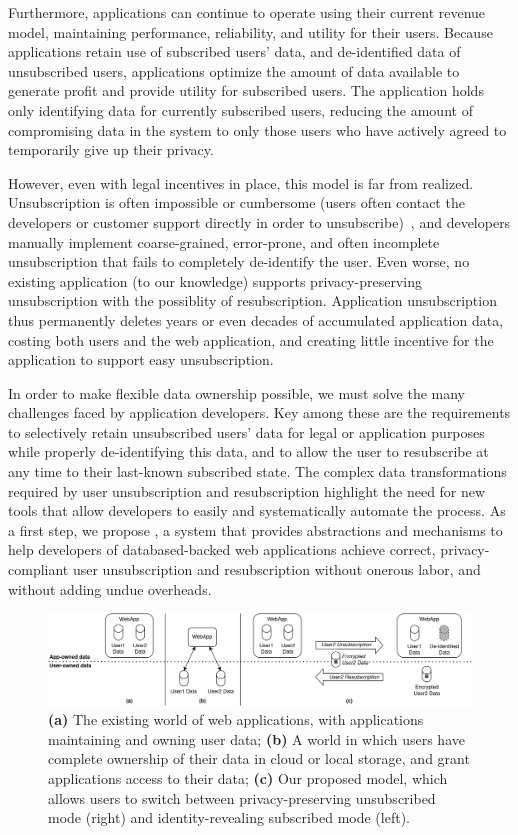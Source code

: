 Furthermore, applications can continue to operate using their current revenue model, maintaining performance,
reliability, and utility for their users. 
Because applications retain use of subscribed users' data, and de-identified data of unsubscribed
users, applications optimize the amount of data available to generate profit and provide utility for
subscribed users. The application holds only identifying data for currently subscribed
users, reducing the amount of compromising data in the system to only those users who have
actively agreed to temporarily give up their privacy.

However, even with legal incentives in place, this model is far from realized. Unsubscription is
often impossible or cumbersome (users often contact the developers or customer support directly in
order to unsubscribe)~\cite{jdm}, and developers manually implement coarse-grained, error-prone, and
often incomplete unsubscription that fails to completely de-identify the user. Even worse, no existing
application (to our knowledge) supports privacy-preserving unsubscription with the possiblity of
resubscription.  Application unsubscription thus permanently deletes years or even decades of
accumulated application data, costing both users and the web application, and creating little
incentive for the application to support easy unsubscription. 

In order to make flexible data ownership possible, we must solve the many challenges faced by
application developers. Key among these are the requirements to selectively retain unsubscribed
users' data for legal or application purposes while properly de-identifying this data, and to allow
the user to resubscribe at any time to their last-known subscribed state. The complex data
transformations required by user unsubscription and resubscription highlight the need for new tools
that allow developers to easily and systematically automate the process. As a first step, we propose
\sys, a system that provides abstractions and mechanisms to help developers of databased-backed web
applications achieve correct, privacy-compliant user unsubscription and resubscription without
onerous labor, and without adding undue overheads.

\begin{figure}[ht!]
    \centering
    \includegraphics[width=\textwidth]{img/worlds}

    \caption{\textbf{(a)} The existing world of web applications, with applications maintaining and
    owning user data; \textbf{(b)} A world in which users have complete ownership of their data in cloud or local
    storage, and grant applications access to their data;
    \textbf{(c)} Our proposed model, which allows users to switch between privacy-preserving unsubscribed
    mode (right) and identity-revealing subscribed mode (left).}
    \label{fig:world}
\end{figure}


